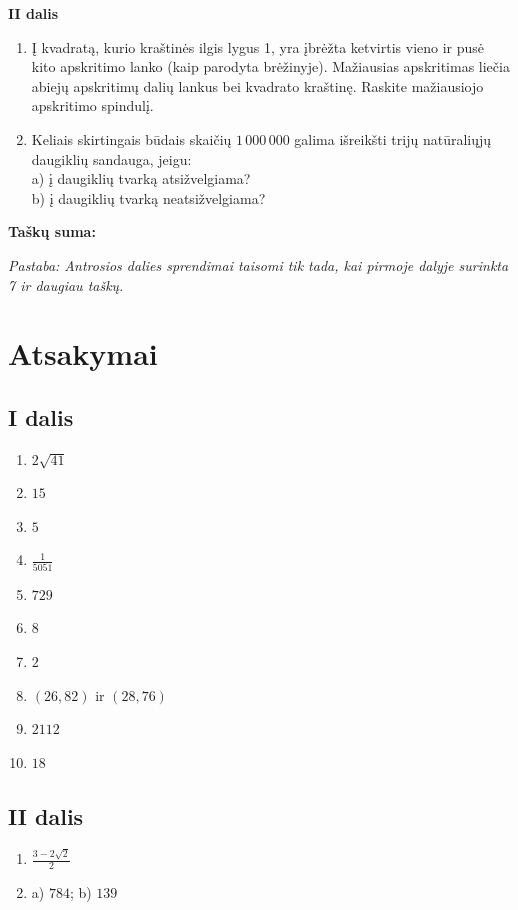 \documentclass[11pt,a4paper]{article}
\begin{document}
\vspace{3mm}
\noindent\textbf{II dalis}

\begin{enumerate}
    \item Į kvadratą, kurio kraštinės ilgis lygus 1, yra įbrėžta ketvirtis vieno ir pusė kito apskritimo lanko (kaip parodyta brėžinyje). Mažiausias apskritimas liečia abiejų apskritimų dalių lankus bei kvadrato kraštinę. Raskite mažiausiojo apskritimo spindulį.
    
    \item Keliais skirtingais būdais skaičių $1\,000\,000$ galima išreikšti trijų natūraliųjų daugiklių sandauga, jeigu: \\
    a) į daugiklių tvarką atsižvelgiama? \\
    b) į daugiklių tvarką neatsižvelgiama?
\end{enumerate}

\vspace{2mm}
\noindent\textbf{Taškų suma:} \dotfill

\vspace{3mm}
\noindent\textit{\footnotesize Pastaba: Antrosios dalies sprendimai taisomi tik tada, kai pirmoje dalyje surinkta 7 ir daugiau taškų.}

\newpage
\section*{Atsakymai}

\subsection*{I dalis}
\begin{enumerate}
    \item $2\sqrt{41}$
    \item $15$
    \item $5$
    \item $\frac{1}{5051}$
    \item $729$
    \item $8$
    \item $2$
    \item $(26, 82)$ ir $(28, 76)$
    \item $2112$
    \item $18$
\end{enumerate}

\subsection*{II dalis}
\begin{enumerate}
    \item $\frac{3-2\sqrt{2}}{2}$
    \item a) $784$; \quad b) $139$
\end{enumerate}
\end{document}
